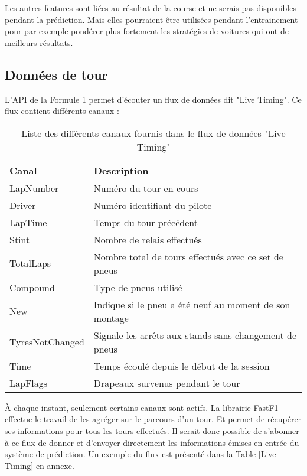 Les autres features sont liées au résultat de la course et ne serais pas disponibles pendant la prédiction.
Mais elles pourraient être utilisées pendant l'entrainement pour par exemple pondérer plus fortement
les stratégies de voitures qui ont de meilleurs résultats.
\subsection{Données de tour}
L'API de la Formule 1 permet d'écouter un flux de données dit "Live Timing".
Ce flux contient différents canaux :
\begin{table}[H]
    \begin{center}
        \caption{Liste des différents canaux fournis dans le flux de données "Live Timing"}
        \begin{tabular}{l|l}
            Canal           & Description                                            \\ \hline
            LapNumber       & Numéro du tour en cours                                \\
            Driver          & Numéro identifiant du pilote                           \\
            LapTime         & Temps du tour précédent                                \\
            Stint           & Nombre de relais effectués                             \\
            TotalLaps       & Nombre total de tours effectués avec ce set de pneus   \\
            Compound        & Type de pneus utilisé                                  \\
            New             & Indique si le pneu a été neuf au moment de son montage \\
            TyresNotChanged & Signale les arrêts aux stands sans changement de pneus \\
            Time            & Temps écoulé depuis le début de la session             \\
            LapFlags        & Drapeaux survenus pendant le tour
        \end{tabular}
    \end{center}
\end{table}

À chaque instant, seulement certains canaux sont actifs. La librairie FastF1 effectue le travail de les agréger sur le parcours d'un tour. Et permet de récupérer ses informations pour tous les tours effectués.
Il serait donc possible de s'abonner à ce flux de donner et d'envoyer directement les informations
émises en entrée du système de prédiction. Un exemple du flux est présenté dans la Table \ref{Live Timing} en annexe.

